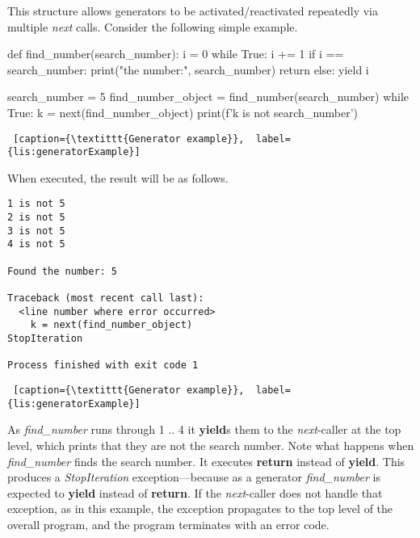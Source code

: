     This structure allows generators to be activated/reactivated repeatedly via multiple \textit{next} calls. Consider the following simple example.
    
\begin{minipage}{\linewidth}  \largev  \hrulefill  
\begin{python}
def find_number(search_number):
    i = 0
    while True:
        i += 1
        if i == search_number:
            print("\nFound the number:", search_number)
            return
        else:
            yield i

search_number = 5
find_number_object = find_number(search_number)
while True:
    k = next(find_number_object)
    print(f'{k} is not {search_number}')
\end{python}
\begin{lstlisting} [caption={\textittt{Generator example}},  label={lis:generatorExample}]
\end{lstlisting}
\end{minipage}

When executed, the result will be as follows.

\begin{minipage}{\linewidth}  \largev  \hrulefill  
\begin{verbatim}
1 is not 5
2 is not 5
3 is not 5
4 is not 5

Found the number: 5

Traceback (most recent call last):
  <line number where error occurred> 
    k = next(find_number_object)
StopIteration

Process finished with exit code 1
\end{verbatim}
\begin{lstlisting} [caption={\textittt{Generator example}},  label={lis:generatorExample}]
\end{lstlisting}
\end{minipage}

As \textit{find\_number} runs through 1 .. 4 it \textbf{yield}s them to the \textit{next}-caller at the top level, which prints that they are not the search number. Note what happens when \textit{find\_number} finds the search number. It executes \textbf{return} instead of \textbf{yield}. This produces a \textit{StopIteration} exception---because as a generator \textit{find\_number} is expected to \textbf{yield} instead of \textbf{return}. If the \textit{next}-caller does not handle that exception, as in this example, the exception propagates to the top level of the overall program, and the program terminates with an error code. 

